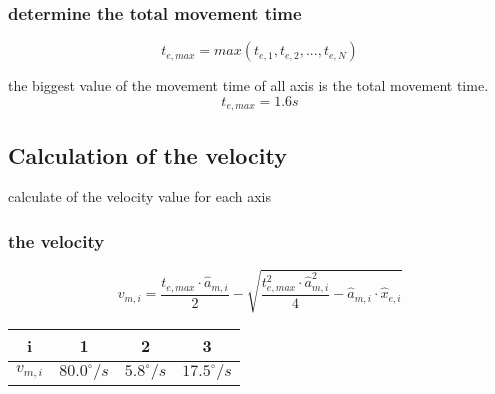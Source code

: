 \documentclass[%
  professionalfonts,%
  xcolor={%
    usenames,%
    dvipsnames,%
    svgnames,%
    table,%
    hyperref%
  }%
]{beamer}
\begin{document}
\subsubsection*{determine the total movement time}
\begin{frame}
\begin{equation*}
t_{e,max} = max(t_{e,1},t_{e,2},...,t_{e,N})
\end{equation*}

the biggest value of the movement time of all axis is the total movement time.
\begin{equation*}
t_{e,max} = 1.6s
\end{equation*}    

\subsection{Calculation of the velocity }
calculate of the velocity value for each axis

\subsubsection*{the velocity}
\begin{equation*}
v_{m,i} = \frac{t_{e,max} \cdot \hat{a}_{m,i}}{2}-\sqrt{\frac{t_{e,max}^2 \cdot \hat{a}_{m,i}^2}{4}-\hat{a}_{m,i}\cdot \hat{x}_{e,i}}
\end{equation*}

\begin{center}
\begin{tabular}{cccc}
\toprule
i & 1 & 2 & 3 \\
\midrule
$v_{m,i}$  & $80.0^\circ/s$   & $5.8^\circ/s$ & $17.5^\circ/s$ \\
\bottomrule 
\end{tabular}
\end{center}
\end{frame}
\end{document}
